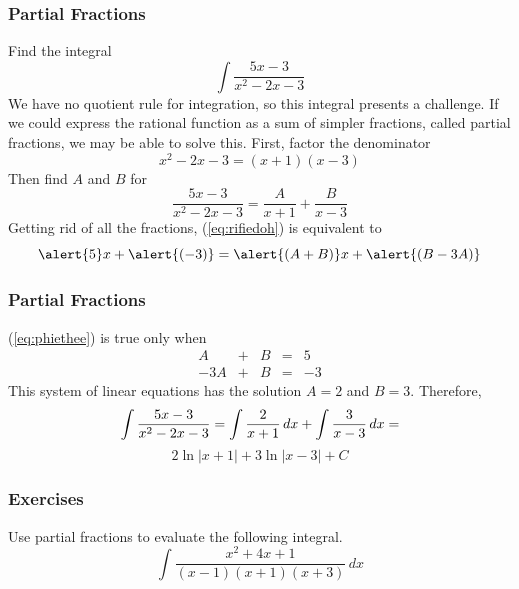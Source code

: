 \documentclass[xcolor=dvipsnames]{beamer}
\begin{document}
\begin{frame}
  \frametitle{Partial Fractions}
  Find the integral
  \begin{equation}
    \label{eq:xaikieji}
    \int\frac{5x-3}{x^{2}-2x-3}
  \end{equation}
We have no quotient rule for integration, so this integral presents a
challenge. If we could express the rational function as a sum of simpler
fractions, called \alert{partial fractions}, we may be able to solve
this. First, factor the denominator
\begin{equation}
  \label{eq:cichacah}
  x^{2}-2x-3=(x+1)(x-3)
\end{equation}
Then find $A$ and $B$ for
\begin{equation}
  \label{eq:rifiedoh}
\frac{5x-3}{x^{2}-2x-3}=\frac{A}{x+1}+\frac{B}{x-3}
\end{equation}
Getting rid of all the fractions, (\ref{eq:rifiedoh}) is equivalent to
\begin{equation}
  \label{eq:phiethee}
\alert{5}x+\alert{(-3)}=\alert{(A+B)}x+\alert{(B-3A)}
\end{equation}
\end{frame}

\begin{frame}
  \frametitle{Partial Fractions}
  (\ref{eq:phiethee}) is true only when
  \begin{equation}
    \label{eq:oorighoe}
    \begin{array}{rcrcr}
      A&+&B&=&5 \\
      -3A&+&B&=&-3
    \end{array}
  \end{equation}
This system of linear equations has the solution $A=2$ and $B=3$.
Therefore,
\begin{equation}
  \label{eq:vaewahsh}
\int\frac{5x-3}{x^{2}-2x-3}=\int\frac{2}{x+1}\,dx+\int\frac{3}{x-3}\,dx=\notag
\end{equation}
\begin{equation}
  \label{eq:moochofe}
2\ln|x+1|+3\ln|x-3|+C
\end{equation}
\end{frame}

\begin{frame}
  \frametitle{Exercises}
  {\ubung} Use partial fractions to evaluate the following integral.
  \begin{equation}
    \label{eq:feirueho}
    \int\frac{x^{2}+4x+1}{(x-1)(x+1)(x+3)}\,dx
  \end{equation}
\end{frame}
\end{document}
